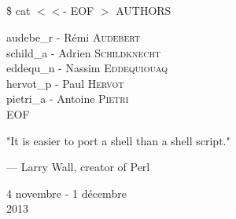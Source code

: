 \begin{titlepage}
    \begin{center}
        \textsc{\Large \reportsubject}\\[0.5cm]
        \HRule \\[0.4cm]
        {\huge \bfseries \reporttitle}\\[0.4cm]
        \HRule \\[1.5cm]
        \begin{minipage}[t]{0.8\textwidth}
                \huge \$ cat $<<$- EOF $>$ AUTHORS
        \end{minipage}

        \bigskip

        \begin{minipage}[t]{0.6\textwidth}
            \begin{flushleft} \large
                audebe\_r - Rémi \textsc{Audebert} \\
                schild\_a - Adrien \textsc{Schildknecht} \\
                eddequ\_n - Nassim \textsc{Eddequiouaq} \\
                hervot\_p - Paul \textsc{Hervot} \\
                pietri\_a - Antoine \textsc{Pietri} \\
                EOF \\
            \end{flushleft}
        \end{minipage}
        \vfill

        \epigraph{
        "It is easier to port a shell than a shell script."}{--- \textup{Larry
        Wall}, creator of Perl}

        {\large 4 novembre - 1 décembre \\ 2013}

    \end{center}

\end{titlepage}
